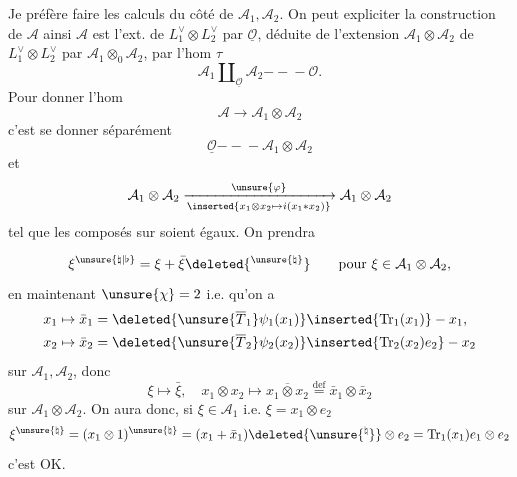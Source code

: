Je préfère faire les calculs du côté de $\mathcal A_1,\mathcal A_2$.
On peut expliciter la construction de $\mathcal A$ ainsi
$\mathcal A$  est l'ext. de $L_1^\vee\otimes L_2^\vee$ par $\underline{\mathcal O}$, déduite de l'extension $\mathcal A_1\otimes\mathcal A_2$ de $L_1^\vee\otimes L_2^\vee$ par $\mathcal A_1\otimes_0\mathcal A_2$, par l'hom $\tau$
\[
\mathcal A_1\amalg_{\underline{\mathcal O}}\mathcal A_2\mathrel{-\!\!-\!\!-}\mathcal O.
\]
Pour donner l'hom
\[
\mathcal A\longrightarrow\mathcal A_1\otimes\mathcal A_2
\]
c'est se donner séparément
\[
\underline{\mathcal O}\mathrel{-\!\!-\!\!-}\mathcal A_1\otimes\mathcal A_2
\]
et
\[
\mathcal A_1\otimes\mathcal A_2\xrightarrow[\inserted{x_1\otimes x_2\mapsto i(x_1*x_2)}]{\unsure{\varphi}}\mathcal A_1\otimes\mathcal A_2
\]
tel que les composés sur
soient égaux. On prendra

\[
\xi^{\unsure{\natural|\flat}}=\xi+\bar\xi\deleted{^{\unsure{\natural}}}
\qquad\text{pour }\xi\in\mathcal A_1\otimes\mathcal A_2,
\]
en  maintenant $\unsure{\chi}=2$ i.e. qu'on a
\[
\begin{aligned}
x_1&\mapsto\bar x_1=\deleted{\unsure{\overline T_1}\psi_1(x_1)}\inserted{\operatorname{Tr}_1(x_1)}-x_1,\\
x_2&\mapsto\bar x_2=\deleted{\unsure{\overline T_2}\psi_2(x_2)}\inserted{\operatorname{Tr}_2(x_2)e_2}-x_2
\end{aligned}
\]
sur $\mathcal A_1,\mathcal A_2$, donc
\[
\xi\mapsto\bar\xi,\quad x_1\otimes x_2\mapsto\overline{x_1\otimes x_2}\overset{\mathrm{def}}=\bar x_1\otimes\bar x_2
\]
sur $\mathcal A_1\otimes\mathcal A_2$. On aura donc, si $\xi\in\mathcal A_1$ i.e. $\xi=x_1\otimes e_2$
\[
\xi^{\unsure{\natural}}=(x_1\otimes1)^{\unsure{\natural}}=(x_1+\bar x_1)\deleted{\unsure{^{\natural}}}\otimes e_2=\operatorname{Tr}_1(x_1)e_1\otimes e_2
\]
c'est OK.


